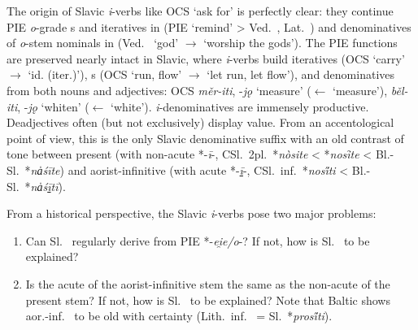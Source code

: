 \documentclass[output=paper,colorlinks,citecolor=brown]{langscibook}
\begin{document}
The origin of Slavic \textit{i}-verbs like OCS  ‘ask for’ is perfectly clear: they continue PIE \textit{o}-grade s and iteratives in  (PIE  ‘remind’ > Ved.\ , Lat.\ ) and denominatives of \textit{o}-stem nominals in  (Ved.\  ‘god’ $\rightarrow$  ‘worship the gods’). The PIE functions are preserved nearly intact in Slavic, where \textit{i}-verbs build iteratives (OCS  ‘carry’ $\rightarrow$  ‘id. (iter.)’), s (OCS  ‘run, flow’ $\rightarrow$  ‘let run, let flow’), and denominatives from both nouns and adjectives: OCS \textit{měr-iti}, -\textit{jǫ} ‘measure’ ($\leftarrow$  ‘measure’), \textit{běl-iti}, -\textit{jǫ} ‘whiten’ ($\leftarrow$  ‘white’). \textit{i}-denominatives are immensely productive. Deadjectives  often (but not exclusively) display  value. From an accentological point of view, this is the only Slavic denominative suffix with an old contrast of tone between present (with non-acute *-\textit{ī}-, CSl.\ 2pl.\ *\textit{nòsite} < *\textit{nosȋte} < Bl.-Sl.\ *\textit{na̍śīte}) and aorist-infinitive (with acute *-\textit{\underline{ī}}-, CSl.\ inf.\ *\textit{nos\H{i}ti} < Bl.-Sl.\ *\textit{na̍ś\underline{ī}tī}).

From a historical perspective, the Slavic \textit{i}-verbs pose two major problems:

\begin{enumerate}
\item Can Sl.\  regularly derive from PIE *-\textit{ei̯e/o}-? If not, how is Sl.\  to be explained?

\item Is the acute  of the aorist-infinitive stem the same as the non-acute  of the present stem? If not, how is Sl.\  to be explained? Note that Baltic shows aor.-inf.\  to be old with certainty (Lith.\ inf.\  = Sl.\ *\textit{pros\H{i}ti}).

\end{enumerate}
\end{document}
